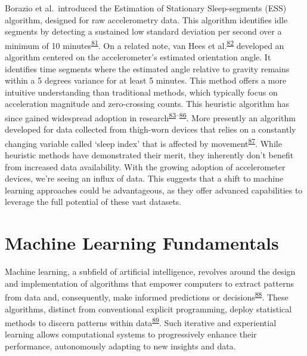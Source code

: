 \documentclass[
  10pt,
]{scrbook}
\begin{document}
Borazio et al.~introduced the Estimation of Stationary Sleep-segments
(ESS) algorithm, designed for raw accelerometry data. This algorithm
identifies idle segments by detecting a sustained low standard deviation
per second over a minimum of 10
minutes\textsuperscript{\protect\hyperlink{ref-borazio_2014}{81}}. On a
related note, van Hees et
al.\textsuperscript{\protect\hyperlink{ref-hees_novel_2015}{82}}
developed an algorithm centered on the accelerometer's estimated
orientation angle. It identifies time segments where the estimated angle
relative to gravity remains within a 5 degrees variance for at least 5
minutes. This method offers a more intuitive understanding than
traditional methods, which typically focus on acceleration magnitude and
zero-crossing counts. This heuristic algorithm has since gained
widespread adoption in
research\textsuperscript{\protect\hyperlink{ref-difrancesco_sleep_2019}{83}--\protect\hyperlink{ref-huxe4usler_2020}{86}}.
More presently an algorithm developed for data collected from thigh-worn
devices that relies on a constantly changing variable called `sleep
index' that is affected by
movement\textsuperscript{\protect\hyperlink{ref-johansson_development_2023}{87}}.
While heuristic methods have demonstrated their merit, they inherently
don't benefit from increased data availability. With the growing
adoption of accelerometer devices, we're seeing an influx of data. This
suggests that a shift to machine learning approaches could be
advantageous, as they offer advanced capabilities to leverage the full
potential of these vast datasets.

\hypertarget{machine-learning-fundamentals}{%
\section{Machine Learning
Fundamentals}\label{machine-learning-fundamentals}}

Machine learning, a subfield of artificial intelligence, revolves around
the design and implementation of algorithms that empower computers to
extract patterns from data and, consequently, make informed predictions
or
decisions\textsuperscript{\protect\hyperlink{ref-hastie01statisticallearning}{88}}.
These algorithms, distinct from conventional explicit programming,
deploy statistical methods to discern patterns within
data\textsuperscript{\protect\hyperlink{ref-bishop_2006}{89}}. Such
iterative and experiential learning allows computational systems to
progressively enhance their performance, autonomously adapting to new
insights and data.
\end{document}

